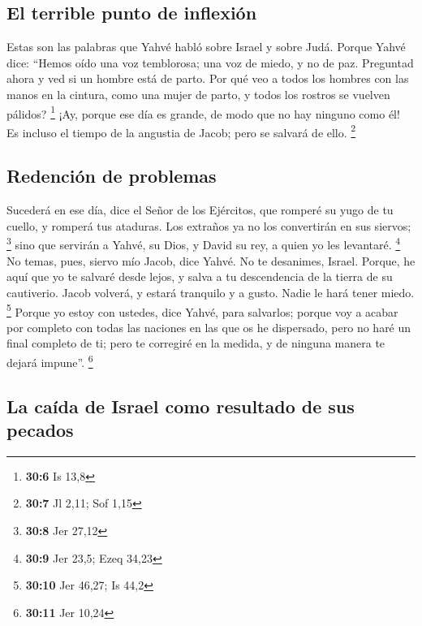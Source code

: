 \begin{paracol}{2}
\hypertarget{el-terrible-punto-de-inflexiuxf3n}{%
\subsection{El terrible punto de
inflexión}\label{el-terrible-punto-de-inflexiuxf3n}}

 Estas son las palabras que Yahvé habló sobre Israel y
sobre Judá.  Porque Yahvé dice: ``Hemos oído una voz
temblorosa; una voz de miedo, y no de paz.  Preguntad
ahora y ved si un hombre está de parto. Por qué veo a todos los hombres
con las manos en la cintura, como una mujer de parto, y todos los
rostros se vuelven pálidos? \footnote{\textbf{30:6} Is 13,8}
 ¡Ay, porque ese día es grande, de modo que no hay ninguno
como él! Es incluso el tiempo de la angustia de Jacob; pero se salvará
de ello. \footnote{\textbf{30:7} Jl 2,11; Sof 1,15}

\hypertarget{redenciuxf3n-de-problemas}{%
\subsection{Redención de problemas}\label{redenciuxf3n-de-problemas}}

 Sucederá en ese día, dice el Señor de los Ejércitos, que
romperé su yugo de tu cuello, y romperá tus ataduras. Los extraños ya no
los convertirán en sus siervos; \footnote{\textbf{30:8} Jer 27,12}
 sino que servirán a Yahvé, su Dios, y David su rey, a
quien yo les levantaré. \footnote{\textbf{30:9} Jer 23,5; Ezeq 34,23}
 No temas, pues, siervo mío Jacob, dice Yahvé. No te
desanimes, Israel. Porque, he aquí que yo te salvaré desde lejos, y
salva a tu descendencia de la tierra de su cautiverio. Jacob volverá, y
estará tranquilo y a gusto. Nadie le hará tener miedo. \footnote{\textbf{30:10}
  Jer 46,27; Is 44,2}  Porque yo estoy con ustedes, dice
Yahvé, para salvarlos; porque voy a acabar por completo con todas las
naciones en las que os he dispersado, pero no haré un final completo de
ti; pero te corregiré en la medida, y de ninguna manera te dejará
impune''. \footnote{\textbf{30:11} Jer 10,24}

\hypertarget{la-cauxedda-de-israel-como-resultado-de-sus-pecados}{%
\subsection{La caída de Israel como resultado de sus
pecados}\label{la-cauxedda-de-israel-como-resultado-de-sus-pecados}}


\end{paracol}
